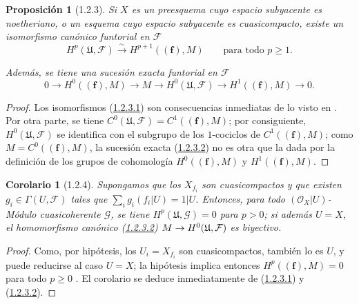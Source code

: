 \documentclass[10pt,oneside,openany]{book}
\theoremstyle{egaenv}\newtheorem*{env}{---}
\theoremstyle{egastatement}
\newtheorem*{proposition}{Proposición}
\newtheorem*{corollary}{Corolario}
\theoremstyle{egadescription}
\newcommand{\oldpage}[2][]{\marginnote{\normalfont\scriptsize\textbf{#1}\,|\,#2}\ignorespaces}
\renewcommand{\geq}{\geqslant}
\renewcommand{\to}{\mathchoice{\longrightarrow}{\rightarrow}{\rightarrow}{\rightarrow}}
\begin{document}
\begin{proposition}[1.2.3]
\label{III.1.2.3}
\label{III.1.2.3-fr}
Si $X$ es un preesquema cuyo espacio subyacente es noetheriano, o un esquema cuyo espacio subyacente es cuasicompacto, existe un isomorfismo canónico funtorial en $\mathcal F$
\begin{equation}
\label{III.1.2.3.1-fr}
\tag{1.2.3.1}
H^p(\mathfrak U,\mathcal F)\xrightarrow{\sim}H^{p+1}((\mathbf f),M)
\qquad\text{para todo }p\geq1.
\end{equation}

Además, se tiene una sucesión exacta funtorial en $\mathcal F$
\begin{equation}
\label{III.1.2.3.2-fr}
\tag{1.2.3.2}
0\longrightarrow H^0((\mathbf f),M)\longrightarrow M
\longrightarrow H^0(\mathfrak U,\mathcal F)
\longrightarrow H^1((\mathbf f),M)\longrightarrow0.
\end{equation}
\end{proposition}

\oldpage[III]{87}
\begin{proof}
Los isomorfismos (\hyperref[III.1.2.3.1]{1.2.3.1}) son consecuencias inmediatas de lo visto en .
Por otra parte, se tiene $C^0(\mathfrak U,\mathcal F)=C^1((\mathbf f),M)$; por consiguiente, $H^0(\mathfrak U,\mathcal F)$ se identifica con el subgrupo de los $1$-cociclos de $C^1((\mathbf f),M)$; como $M=C^0((\mathbf f),M)$, la sucesión exacta (\hyperref[III.1.2.3.2]{1.2.3.2}) no es otra que la dada por la definición de los grupos de cohomología $H^0((\mathbf f),M)$ y $H^1((\mathbf f),M)$.
\end{proof}

\begin{corollary}[1.2.4]
\label{III.1.2.4}
\label{III.1.2.4-fr}
Supongamos que los $X_{f_i}$ son cuasicompactos y que existen $g_i\in\Gamma(U,\mathcal F)$ tales que
$\sum_i g_i(f_i\vert U)=1\vert U$. Entonces, para todo
$(\mathcal O_X\vert U)$-Módulo cuasicoherente $\mathcal G$, se tiene $H^p(\mathfrak U,\mathcal G)=0$ para $p>0$; si además $U=X$, el homomorfismo canónico \textup{(\hyperref[III.1.2.3.2]{1.2.3.2})} $M\to H^0(\mathfrak U,\mathcal F)$ es biyectivo.
\end{corollary}

\begin{proof}
Como, por hipótesis, los $U_i=X_{f_i}$ son cuasicompactos, también lo es $U$, y puede reducirse al caso $U=X$; la hipótesis implica entonces
$H^p((\mathbf f),M)=0$ para todo $p\geq0$ .
El corolario se deduce inmediatamente de (\hyperref[III.1.2.3.1]{1.2.3.1}) y (\hyperref[III.1.2.3.2]{1.2.3.2}).
\end{proof}
\end{document}
